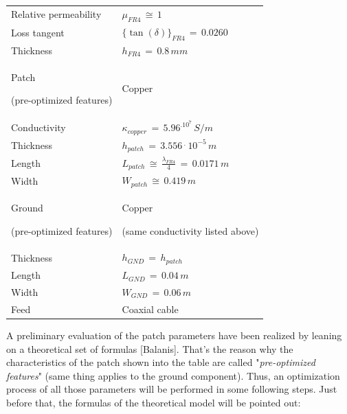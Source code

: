 \documentclass[12pt,a4paper]{article}
\begin{document}
{\begin{table}[h]
\begin{center}
{\begin{tabular}{||m{5cm}|m{5cm}||}
						Relative permeability & $\mu_{FR4}\,\cong\,1$\\
						
						Loss tangent & $\{\tan(\delta)\}_{FR4}\,=\,0.0260$\\
						
						Thickness & $h_{FR4}\,=\,0.8\,mm$\\
						\hline
						\cellcolor{pink} Patch
						
						(pre-optimized features) & \cellcolor{pink} Copper \\
						\hline
					Conductivity & $\kappa_{copper}\,=\,5.96^.10^7\,S/m$ \\
					
					Thickness & $h_{patch}\,=\,3.556\,^.\,10^{-5}\,m$\\
					
					Length & $L_{patch}\,\cong\,\frac{\lambda_{FR4}}{4}\,=\,0.0171\,m$\\
					
					Width & $W_{patch}\,\cong\,0.419\,m$\\
					
					\hline
					\cellcolor{pink}Ground 
					
					(pre-optimized features)
					& \cellcolor{pink} Copper
					
					(same conductivity listed above) \\
					\hline
					Thickness & $h_{GND}\,=\,h_{patch}$
					\\
					Length & $L_{GND}\,=\,0.04\,m$\\
					Width & $W_{GND}\,=\,0.06\,m$\\
					\hline
					\cellcolor{pink}Feed & \cellcolor{pink} Coaxial cable \\
					\hline
			\end{tabular}}
		\end{center}
	\end{table}
	A preliminary evaluation of the patch parameters have been realized by leaning on a theoretical set of formulas [Balanis]. That's the reason why the characteristics of the patch shown into the table are called "\emph{pre-optimized features}" (same thing applies to the ground component). Thus, an optimization process of all those parameters will be performed in some following steps. Just before that, the formulas of the theoretical model will be pointed out:
	
}
\end{document}
